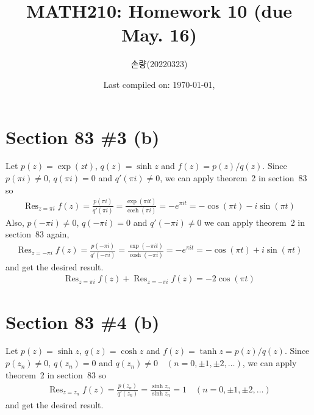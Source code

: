 \documentclass{scrartcl}
\title{MATH210: Homework 10 (due May. 16)}
\author{손량(20220323)}
\date{Last compiled on: \today, \currenttime}
\DeclareMathOperator*{\Res}{Res}
\begin{document}
\maketitle

\section{Section 83 \#3 (b)}
Let \(p(z) = \exp(zt)\), \(q(z) = \sinh z\) and \(f(z) = p(z) / q(z)\).
Since \(p(\pi i) \not = 0\), \(q(\pi i) = 0\) and \(q'(\pi i) \not = 0\), we can apply theorem~2 in section~83 so
\begin{align*}
  \Res_{z = \pi i} f(z)
  = \frac{p(\pi i)}{q'(\pi i)}
  = \frac{\exp(\pi it)}{\cosh(\pi i)}
  = -e^{\pi it}
  = -\cos (\pi t) - i\sin(\pi t)
\end{align*}
Also, \(p(-\pi i) \not = 0\), \(q(-\pi i) = 0\) and \(q'(-\pi i) \not = 0\) we can apply theorem~2 in section~83 again,
\begin{align*}
  \Res_{z = -\pi i} f(z)
  = \frac{p(-\pi i)}{q'(-\pi i)}
  = \frac{\exp(-\pi it)}{\cosh(-\pi i)}
  = -e^{\pi it}
  = -\cos (\pi t) + i\sin (\pi t)
\end{align*}
and get the desired result.
\begin{align*}
  \Res_{z = \pi i} f(z) + \Res_{z = -\pi i} f(z) = -2\cos (\pi t)
\end{align*}

\section{Section 83 \#4 (b)}
Let \(p(z) = \sinh z,\, q(z) = \cosh z\) and \(f(z) = \tanh z = p(z) / q(z)\).
Since \(p(z_n) \not = 0,\, q(z_n) = 0\) and \(q(z_n) \not = 0 \quad (n = 0, \pm 1, \pm 2, \dots)\), we can apply theorem~2 in section~83 so
\begin{align*}
  \Res_{z = z_n} f(z)
  = \frac{p(z_n)}{q'(z_n)}
  = \frac{\sinh z_n}{\sinh z_n}
  = 1 \quad (n = 0, \pm 1, \pm 2, \dots)
\end{align*}
and get the desired result.
\end{document}
